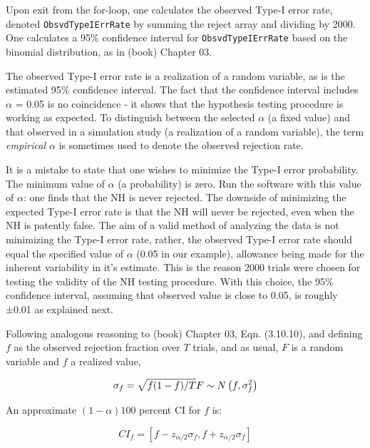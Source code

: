 \documentclass[
]{book}
\begin{document}
Upon exit from the for-loop, one calculates the observed Type-I error rate, denoted \texttt{ObsvdTypeIErrRate} by summing the reject array and dividing by 2000. One calculates a 95\% confidence interval for \texttt{ObsvdTypeIErrRate} based on the binomial distribution, as in (book) Chapter 03.

The observed Type-I error rate is a realization of a random variable, as is the estimated 95\% confidence interval. The fact that the confidence interval includes \(\alpha\) = 0.05 is no coincidence - it shows that the hypothesis testing procedure is working as expected. To distinguish between the selected \(\alpha\) (a fixed value) and that observed in a simulation study (a realization of a random variable), the term \emph{empirical \(\alpha\)} is sometimes used to denote the observed rejection rate.

It is a mistake to state that one wishes to minimize the Type-I error probability. The minimum value of \(\alpha\) (a probability) is zero. Run the software with this value of \(\alpha\): one finds that the NH is never rejected. The downside of minimizing the expected Type-I error rate is that the NH will never be rejected, even when the NH is patently false. The aim of a valid method of analyzing the data is not minimizing the Type-I error rate, rather, the observed Type-I error rate should equal the specified value of \(\alpha\) (0.05 in our example), allowance being made for the inherent variability in it's estimate. This is the reason 2000 trials were chosen for testing the validity of the NH testing procedure. With this choice, the 95\% confidence interval, assuming that observed value is close to 0.05, is roughly ±0.01 as explained next.

Following analogous reasoning to (book) Chapter 03, Eqn. (3.10.10), and defining \(f\) as the observed rejection fraction over \(T\) trials, and as usual, \(F\) is a random variable and \(f\) a realized value,

\begin{equation*} 
\sigma_f = \sqrt{f(1-f)/T} \\
F \sim N\left ( f,\sigma_{f}^{2} \right )
\end{equation*}

An approximate \((1-\alpha)100\) percent CI for \(f\) is:

\begin{equation*} 
{CI}_f = \left [ f-z_{\alpha/2}\sigma_f, f+z_{\alpha/2}\sigma_f \right ]
\end{equation*}
\end{document}
